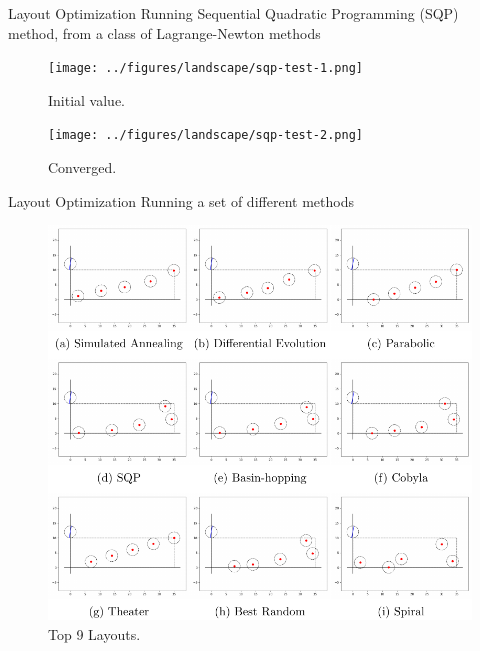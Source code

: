 \documentclass[10pt, xcolor={dvipsnames}]{beamer}
\begin{document}
\begin{frame}{Layout Optimization}
Running Sequential Quadratic Programming (SQP) method, from a class of Lagrange-Newton methods
\begin{minipage}[t]{0.5\textwidth}
\begin{center}
\begin{figure}
\texttt{[image: ../figures/landscape/sqp-test-1.png]}
\caption{Initial value.}
\end{figure}
\end{center}
\end{minipage}%
\begin{minipage}[t]{0.5\textwidth}
\vspace{0.15cm}
\begin{center}
\begin{figure}
\texttt{[image: ../figures/landscape/sqp-test-2.png]}
\caption{Converged.}
\end{figure}
\end{center}
\end{minipage}
\end{frame}

\begin{frame}{Layout Optimization}
Running a set of different methods
\begin{center}
\begin{figure}
\includegraphics[width=.64\textwidth]{../figures/layouts/layouts.pdf}
\caption{Top 9 Layouts.}
\end{figure}
\end{center}
\end{frame}
\end{document}
